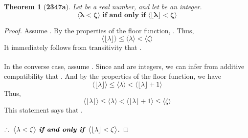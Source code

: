 \documentclass[preview]{standalone}
\newtheorem*{theorem*}{Theorem}
\begin{document}
\begin{theorem*}[\textbf{2347a}]
    Let \bm{$\lambda$} be a real number, 
    and let \bm{$\zeta$} be an integer. 
    \begin{equation*}
        \bm{\big \langle \lambda < \zeta \big \rangle
            \textbf{ if and only if } 
        \big \langle \lfloor \lambda \rfloor < \zeta \big \rangle
        }
    \end{equation*}
\end{theorem*}

\begin{proof}
    Assume \bm{$\lambda < \zeta$}. 
    By the properties of the floor function,
    \bm{$\lfloor \lambda \rfloor \leq \lambda$}. 
    Thus,
    \begin{equation*}
        \Big \langle \lfloor \lambda \rfloor \Big \rangle
            \leq 
        \Big \langle \lambda \Big \rangle
            < 
        \Big \langle \zeta \Big \rangle
    \end{equation*}
    It immediately follows from transitivity that 
    \bm{$\lfloor \lambda \rfloor < \zeta$}.
    \\ \\
    In the converse case, 
    assume \bm{$\lfloor \lambda \rfloor < \zeta$}. 
    Since \bm{$\lfloor \lambda \rfloor$} and \bm{$\zeta$} are integers, 
    we can infer from additive compatibility that
    \bm{$\lfloor \lambda \rfloor + 1 \le \zeta$}. 
    And by the properties of the floor function, we have
    \begin{equation*}
        \Big \langle \lfloor \lambda \rfloor \Big \rangle
            \leq 
        \Big \langle \lambda \Big \rangle 
            <
        \Big \langle \lfloor \lambda \rfloor + 1 \Big \rangle
    \end{equation*}
    Thus,
    \begin{equation*}
        \Big \langle \lfloor \lambda \rfloor \Big \rangle
            \le 
        \Big \langle \lambda \Big \rangle
            < 
        \Big \langle \lfloor \lambda \rfloor + 1 \Big \rangle
            \le 
        \Big \langle \zeta \Big \rangle
    \end{equation*}
    This statement says that \bm{$\lambda < \zeta$}.
    \\ \\
    $\therefore \text{\space} \relax{
        \big \langle \lambda < \zeta \big \rangle
            \textbf{ \emph{if and only if} } 
        \big \langle \lfloor \lambda \rfloor < \zeta \big \rangle
    }$.
\color{lightgray} \end{proof}
\end{document}
